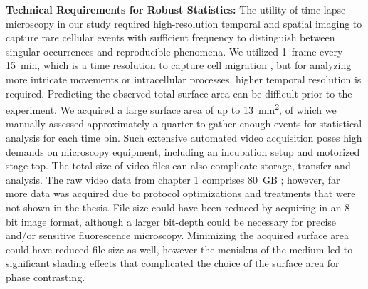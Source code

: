 \textbf{Technical Requirements for Robust Statistics:} The utility of time-lapse
microscopy in our study required high-resolution temporal and spatial imaging to
capture rare cellular events with sufficient frequency to distinguish between
singular occurrences and reproducible phenomena. We utilized \SI{1}{frame} every
\SI{15}{\minute}, which is a  time resolution to capture cell migration
\cite{huthSignificantlyImprovedPrecision2010}, but for analyzing more intricate
movements or intracellular processes, higher temporal resolution is required.
Predicting the observed total surface area can be difficult prior to the
experiment. We acquired a large surface area of up to
\SI{13}{\milli\meter\squared}, of which we manually assessed approximately a
quarter to gather enough events for statistical analysis for each time bin. Such
extensive automated video acquisition poses high demands on microscopy
equipment, including an incubation setup and motorized stage top. The total size
of video files can also complicate storage, transfer and analysis. The raw video
data from chapter 1 comprises \SI{80}{GB}
\cite{biostudiesBioStudiesEuropeanBioinformatics}; however, far more data was
acquired due to protocol optimizations and treatments that were not shown in the
thesis. File size could have been reduced by acquiring in an 8-bit image format,
although a larger bit-depth could be necessary for precise and/or sensitive
fluorescence microscopy. Minimizing the acquired surface area could have reduced
file size as well, however the meniskus of the medium led to significant shading
effects that complicated the choice of the surface area for phase contrasting.

